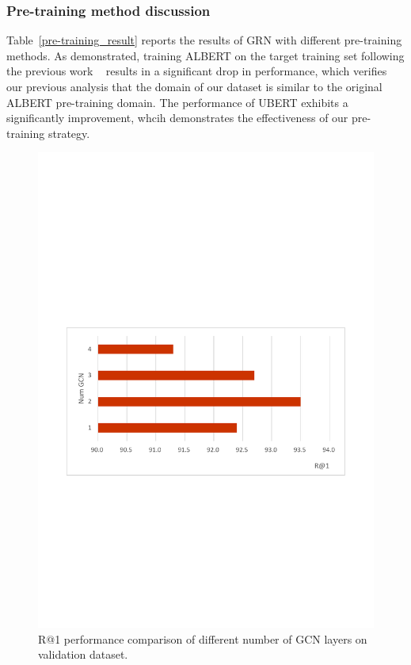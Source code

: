 \documentclass[letterpaper]{article}
\begin{document}
\subsubsection{Pre-training method discussion}
Table~\ref{pre-training_result} reports the results of GRN with different pre-training methods. As demonstrated, training ALBERT on the target training set following the previous work ~\cite{Lan2020} results in a significant drop in performance, which verifies our previous analysis that the domain of our dataset is similar to the original ALBERT pre-training domain. The performance of UBERT exhibits a significantly improvement, whcih demonstrates the effectiveness of our pre-training strategy.
\begin{figure}[t]
\centering
\includegraphics[width=1\columnwidth]{NGCN}
\caption{R@1 performance comparison of different number of GCN layers on validation dataset.}
\label{NGCN}
\end{figure}
\end{document}
